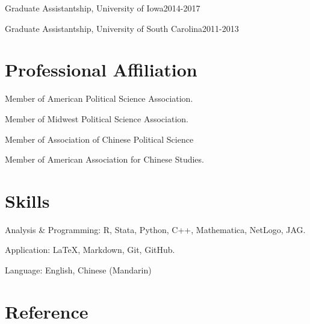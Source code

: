 \documentclass[10.5pt,]{article}
\providecommand{\tightlist}{%
  \setlength{\itemsep}{0pt}\setlength{\parskip}{0pt}}
\renewenvironment{itemize}{
  \begin{list}{}{
    \setlength{\leftmargin}{1.5em}
  }
}{
  \end{list}
}
\begin{document}
\begin{itemize}
\tightlist
\item
  Graduate Assistantship, University of Iowa\hfill 2014-2017
\item
  Graduate Assistantship, University of South Carolina\hfill 2011-2013
\end{itemize}

\section{Professional Affiliation}\label{professional-affiliation}

\begin{itemize}
\tightlist
\item
  Member of American Political Science Association.
\item
  Member of Midwest Political Science Association.
\item
  Member of Association of Chinese Political Science
\item
  Member of American Association for Chinese Studies.
\end{itemize}

\section{Skills}\label{skills}

\begin{itemize}
\tightlist
\item
  Analysis \& Programming: R, Stata, Python, C++, Mathematica, NetLogo,
  JAG.
\item
  Application: \LaTeX, Markdown, Git, GitHub.
\item
  Language: English, Chinese (Mandarin)
\end{itemize}

\section{Reference}\label{reference}
\end{document}
